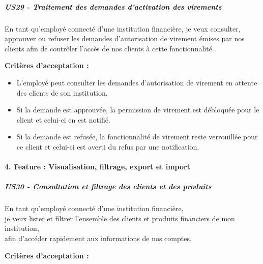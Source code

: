 \hypertarget{us29---traitement-des-demandes-dactivation-des-virements}{%
\subparagraph{US29 - Traitement des demandes d'activation des
virements}\label{us29---traitement-des-demandes-dactivation-des-virements}}

En tant qu'employé connecté d'une institution financière, je veux
consulter, approuver ou refuser les demandes d'autorisation de virement
émises par nos clients afin de contrôler l'accès de nos clients à cette
fonctionnalité.

\textbf{Critères d'acceptation :}

\begin{itemize}
\tightlist
\item
  L'employé peut consulter les demandes d'autorisation de virement en
  attente des clients de son institution.
\item
  Si la demande est approuvée, la permission de virement est débloquée
  pour le client et celui-ci en est notifié.
\item
  Si la demande est refusée, la fonctionnalité de virement reste
  verrouillée pour ce client et celui-ci est averti du refus par une
  notification.
\end{itemize}

\hypertarget{feature-visualisation-filtrage-export-et-import}{%
\paragraph{4. Feature : Visualisation, filtrage, export et
import}\label{feature-visualisation-filtrage-export-et-import}}

\hypertarget{us30---consultation-et-filtrage-des-clients-et-des-produits}{%
\subparagraph{US30 - Consultation et filtrage des clients et des
produits}\label{us30---consultation-et-filtrage-des-clients-et-des-produits}}

En tant qu'employé connecté d'une institution financière,\\
je veux lister et filtrer l'ensemble des clients et produits financiers
de mon institution,\\
afin d'accéder rapidement aux informations de nos comptes.

\textbf{Critères d'acceptation :}

